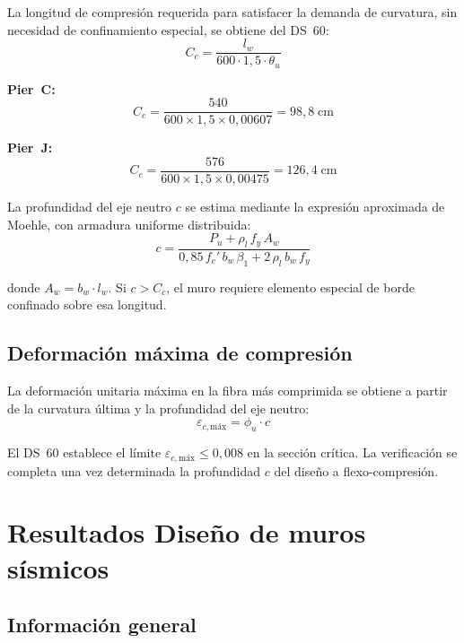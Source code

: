 La longitud de compresión requerida para satisfacer la demanda de curvatura, sin necesidad
de confinamiento especial, se obtiene del DS~60:
\begin{equation}
    C_c = \frac{l_w}{600 \cdot 1{,}5 \cdot \theta_u}
\end{equation}

\textbf{Pier~C:}
\begin{equation}
    C_c = \frac{540}{600 \times 1{,}5 \times 0{,}00607} = 98{,}8\;\text{cm}
\end{equation}

\textbf{Pier~J:}
\begin{equation}
    C_c = \frac{576}{600 \times 1{,}5 \times 0{,}00475} = 126{,}4\;\text{cm}
\end{equation}

La profundidad del eje neutro $c$ se estima mediante la expresión aproximada de Moehle,
con armadura uniforme distribuida:
\begin{equation}
    c = \frac{P_u + \rho_l\,f_y\,A_w}
             {0{,}85\,f_c'\,b_w\,\beta_1 + 2\,\rho_l\,b_w\,f_y}
\end{equation}

donde $A_w = b_w \cdot l_w$. Si $c > C_c$, el muro requiere elemento especial de borde
confinado sobre esa longitud.

\subsection{Deformación máxima de compresión}

La deformación unitaria máxima en la fibra más comprimida se obtiene a partir de la
curvatura última y la profundidad del eje neutro:
\begin{equation}
    \varepsilon_{c,\text{máx}} = \phi_u \cdot c
\end{equation}

El DS~60 establece el límite $\varepsilon_{c,\text{máx}} \leq 0{,}008$ en la sección crítica.
La verificación se completa una vez determinada la profundidad $c$ del diseño a
flexo-compresión.

\section{Resultados Diseño de muros sísmicos}

\subsection{Información general}

